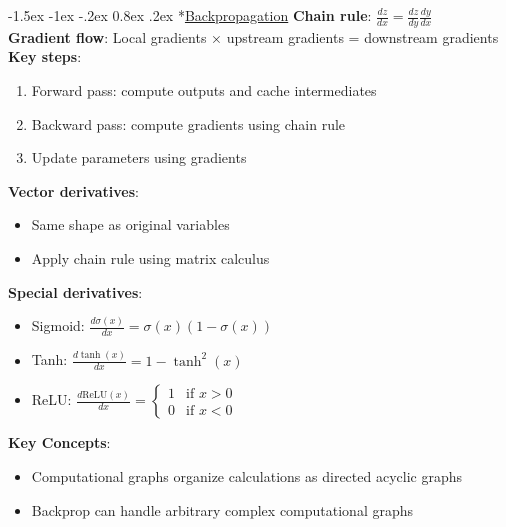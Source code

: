 \documentclass{article}
\makeatletter
\renewcommand\section{\@startsection{section}{1}{\z@}%
                                  {-1.5ex \@plus -1ex \@minus -.2ex}%
                                  {0.8ex \@plus.2ex}%
                                  {\normalfont\small\bfseries}}
\makeatother
\begin{document}
\begin{multicols}{3}
\section*{\underline{Backpropagation}}
\textbf{Chain rule}: $\frac{dz}{dx} = \frac{dz}{dy} \frac{dy}{dx}$\\
\textbf{Gradient flow}: Local gradients × upstream gradients = downstream gradients\\
\textbf{Key steps}:
\begin{enumerate}
\item Forward pass: compute outputs and cache intermediates
\item Backward pass: compute gradients using chain rule
\item Update parameters using gradients
\end{enumerate}

\textbf{Vector derivatives}:
\begin{itemize}
\item Same shape as original variables
\item Apply chain rule using matrix calculus
\end{itemize}

\textbf{Special derivatives}:
\begin{itemize}
\item Sigmoid: $\frac{d\sigma(x)}{dx} = \sigma(x)(1-\sigma(x))$
\item Tanh: $\frac{d\tanh(x)}{dx} = 1 - \tanh^2(x)$
\item ReLU: $\frac{d\text{ReLU}(x)}{dx} = \begin{cases} 1 & \text{if } x > 0 \\ 0 & \text{if } x < 0 \end{cases}$
\end{itemize}

\textbf{Key Concepts}:
\begin{itemize}
\item Computational graphs organize calculations as directed acyclic graphs
\item Backprop can handle arbitrary complex computational graphs
\end{itemize}


\end{multicols}
\end{document}

